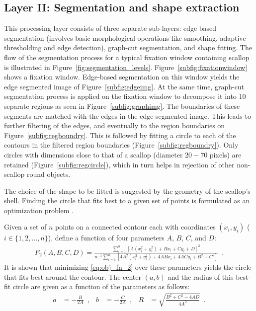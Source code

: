 \subsection{Layer II: Segmentation and shape extraction}
\label{subsec:layer2}

This processing layer consists of
three separate sub-layers: edge based segmentation (involves basic morphological 
operations like smoothing, adaptive thresholding and edge detection), graph-cut 
segmentation, and shape fitting. 
The flow of the segmentation process for a typical fixation window containing  scallop is illustrated in Figure~\ref{fig:segmentation_levels}. 
Figure~\ref{subfig:fixationwindow} shows a fixation window.
Edge-based segmentation on this window yields the edge segmented image of Figure~\ref{subfig:edgeimg}.
At the same time, graph-cut segmentation process \cite{shi} is applied on the 
fixation window to decompose it into 10 separate regions
as seen in Figure~\ref{subfig:graphimg}. The boundaries of these
segments are matched with the edges in the edge segmented image.
This leads to further filtering of the edges, and eventually to the region boundaries
on Figure~\ref{subfig:regboundry}.
This is followed by fitting a circle to 
each of the contours in the filtered region boundaries (Figure~\ref{subfig:regboundry}). 
Only circles with dimensions close to that of a scallop (diameter $20 - 70$ pixels) 
are retained (Figure~\ref{subfig:regcircle}), which in turn helps in rejection of other 
non-scallop round objects.

The choice of the
shape to be fitted is suggested by the geometry of the scallop's shell.
Finding the circle that fits best to a given set of points is formulated as
an optimization problem \cite{taubin,chernov}.

Given a set of $n$ points on a connected contour each with coordinates $(x_i,y_i)$ ($i\in\{1,2,\ldots,n\}$), 
define a  function of four parameters $A$, $B$, $C$, and $D$:
\begin{align} \label{eq:obj_fn_2}
 F_2(A,B,C,D) = \frac{\sum_{i=1}^{n} [A(x_i^2+y_i^2)+Bx_i+Cy_i+D]^2}{n^{-1}\sum_{i=1}^{n} [4A^2(x_i^2+y_i^2)+4ABx_i+4ACy_i+B^2+C^2]} \enspace.
\end{align}
It is shown \cite{taubin} that minimizing \eqref{eq:obj_fn_2} over these parameters yields the circle that fits best around the contour.
The center $(a,b)$ and the radius of this best-fit circle are given as a function of
the parameters as follows:
%
\begin{align} \label{fit-parameters}
a&=-\frac{B}{2A}\enspace,&  b&=-\frac{C}{2A} \enspace, &
R&=\sqrt{\frac{B^2+C^2-4AD}{4A^2}}  \enspace.
\end{align} 

